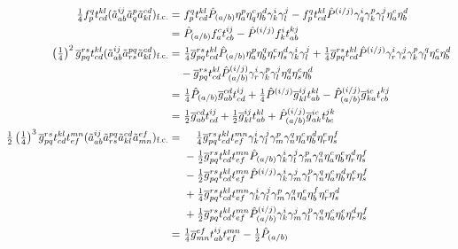\documentclass[11pt,fleqn]{article}
\newcommand{\g}{\gamma}      %
\newcommand{\h}{\eta}        %
\newcommand{\tl}{\ensuremath{\tilde}}
\newcommand{\ol}[1]{\ensuremath{\overline{#1}}}
\newcommand{\op}[1]{\ensuremath{\hat{#1}}}
\newcommand{\pr}[1]{\ensuremath{\left(#1\right)}}
\theoremstyle{mystyle}
\begin{document}
\begin{align*}
  \tfrac{1}{4}
  f_p^q
  t_{cd}^{kl}
  (\tl{a}_{ab}^{ij}\tl{a}_q^p\tl{a}_{kl}^{cd})_{\text{f.c.}}
=&\
  f_p^q
  t_{cd}^{kl}
  \op{P}_{(a/b)}
  \h_a^p\h_q^c\h_b^d\g_k^i\g_l^j
-
  f_p^q
  t_{cd}^{kl}
  \op{P}^{(i/j)}
  \g_q^i\g_k^p\g_l^j\h_a^c\h_b^d
\\=&\
  \op{P}_{(a/b)}
  f_a^c
  t_{cb}^{ij}
-
  \op{P}^{(i/j)}
  f_k^i
  t_{ab}^{kj}
\\
  \pr{\tfrac{1}{4}}^2
  \ol{g}_{pq}^{rs}
  t_{cd}^{kl}
  (\tl{a}_{ab}^{ij}\tl{a}_{rs}^{pq}\tl{a}_{kl}^{cd})_{\text{f.c.}}
=&\
  \tfrac{1}{4}
  \ol{g}_{pq}^{rs}
  t_{cd}^{kl}
  \op{P}_{(a/b)}
  \h_a^p\h_b^q\h_r^c\h_s^d
  \g_k^i\g_l^j
+
  \tfrac{1}{4}
  \ol{g}_{pq}^{rs}
  t_{cd}^{kl}
  \op{P}^{(i/j)}
  \g_r^i\g_s^j\g_k^p\g_l^q
  \h_a^c\h_b^d
\\&
-
  \ol{g}_{pq}^{rs}
  t_{cd}^{kl}
  \op{P}^{(i/j)}
        _{(a/b)}
  \g_r^i\g_k^p\g_l^j
  \h_a^q\h_s^c\h_b^d
\\=&\
  \tfrac{1}{4}
  \op{P}_{(a/b)}
  \ol{g}_{ab}^{cd}
  t_{cd}^{ij}
+
  \tfrac{1}{4}
  \op{P}^{(i/j)}
  \ol{g}_{kl}^{ij}
  t_{ab}^{kl}
-
  \op{P}^{(i/j)}
        _{(a/b)}
  \ol{g}_{ka}^{ic}
  t_{cb}^{kj}
\\=&\
  \tfrac{1}{2}
  \ol{g}_{ab}^{cd}
  t_{cd}^{ij}
+
  \tfrac{1}{2}
  \ol{g}_{kl}^{ij}
  t_{ab}^{kl}
+
  \op{P}^{(i/j)}
        _{(a/b)}
  \ol{g}_{ak}^{ic}
  t_{bc}^{jk}
\\
  \tfrac{1}{2}
  \pr{\tfrac{1}{4}}^3
  \ol{g}_{pq}^{rs}
  t_{cd}^{kl}t_{ef}^{mn}
  (\tl{a}_{ab}^{ij}\tl{a}_{rs}^{pq}\tl{a}_{kl}^{cd}\tl{a}_{mn}^{ef})_{\text{f.c.}}
=&\
\hphantom+\
  \tfrac{1}{4}
  \ol{g}_{pq}^{rs}
  t_{cd}^{kl}t_{ef}^{mn}
  \g_k^i\g_l^j\g_m^p\g_n^q
  \h_a^c\h_b^d\h_r^e\h_s^f
\\&\
-
  \tfrac{1}{2}
  \ol{g}_{pq}^{rs}
  t_{cd}^{kl}t_{ef}^{mn}
  \op{P}_{(a/b)}
  \g_k^i\g_l^j\g_m^p\g_n^q
  \h_a^c\h_b^e\h_r^d\h_s^f
\\&\
-
  \tfrac{1}{2}
  \ol{g}_{pq}^{rs}
  t_{cd}^{kl}t_{ef}^{mn}
  \op{P}^{(i/j)}
  \g_k^i\g_m^j\g_l^p\g_n^q
  \h_a^c\h_b^d\h_r^e\h_s^f
\\&\
+
  \tfrac{1}{4}
  \ol{g}_{pq}^{rs}
  t_{cd}^{kl}t_{ef}^{mn}
  \g_k^i\g_l^j\g_m^p\g_n^q
  \h_a^e\h_b^f\h_r^c\h_s^d
\\&\
+
  \tfrac{1}{2}
  \ol{g}_{pq}^{rs}
  t_{cd}^{kl}t_{ef}^{mn}
  \op{P}_{(a/b)}^{(i/j)}
  \g_k^i\g_m^j\g_l^p\g_n^q
  \h_a^c\h_b^e\h_r^d\h_s^f
\\=&\
  \tfrac{1}{4}
  \ol{g}_{mn}^{ef}
  t_{ab}^{ij}t_{ef}^{mn}
-
  \tfrac{1}{2}
  \op{P}_{(a/b)}

\end{align*}
\end{document}
